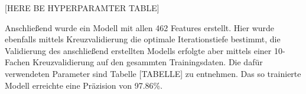 [HERE BE HYPERPARAMTER TABLE]

Anschließend wurde ein Modell mit allen 462 Features erstellt.
Hier wurde ebenfalls mittels Kreuzvalidierung die optimale Iterationstiefe bestimmt, die Validierung des anschließend erstellten Modells erfolgte aber mittels einer 10-Fachen Kreuzvalidierung auf den gesammten Trainingsdaten.
Die dafür verwendeten Parameter sind Tabelle [TABELLE] zu entnehmen.
Das so trainierte Modell erreichte eine Präzision von 97.86\%.
